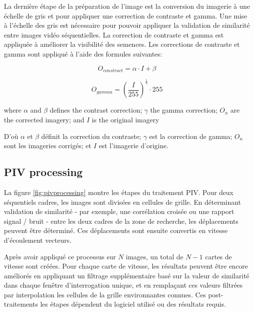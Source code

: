\documentclass[
]{article}
\begin{document}
La dernière étape de la préparation de l'image est la conversion du
imagerie à une échelle de gris et pour appliquer une correction de contraste et gamma.
Une mise à l'échelle des gris est nécessaire pour pouvoir appliquer la validation de similarité entre
images vidéo séquentielles. La correction de contraste et gamma est appliquée à
améliorer la visibilité des semences. Les corrections de contraste et gamma sont
appliqué à l'aide des formules suivantes:

\begin{equation}
O_{constract} = \alpha \cdot I + \beta
\label{eq:constract}
\end{equation}

\begin{equation}
O_{gamma} = \left(\frac{I}{255}\right)^\frac{1}{\gamma} \cdot 255
\label{eq:gamma}
\end{equation}

where \(\alpha\) and \(\beta\) defines the contrast correction; \(\gamma\) the
gamma correction; \(O_n\) are the corrected imagery; and \(I\) is the
original imagery

D'où \(\alpha\) et \(\beta\) définit la correction du contraste; \(\gamma\) est la correction de gamma; \(O_n\) sont les imageries corrigés; et \(I\) est l'imagerie d'origine.

\hypertarget{pp}{%
\subsection{PIV processing}\label{pp}}

La figure \ref{fig:pivprocessing} montre les étapes du traitement PIV. Pour deux séquentiels
cadres, les images sont divisées en cellules de grille. En déterminant
validation de similarité - par exemple, une corrélation croisée ou une
rapport signal / bruit \citetext{\citealp[ ]{ran_application_2016}; \citealp{osorio-cano_method_2013}} -
entre les deux cadres de la zone de recherche, les déplacements peuvent être
déterminé. Ces déplacements sont ensuite convertis en vitesse d'écoulement
vecteurs.

Après avoir appliqué ce processus sur \(𝑁\) images, un total de \(𝑁− 1\) cartes de vitesse
sont créées. Pour chaque carte de vitesse, les résultats peuvent être encore améliorés
en appliquant un filtrage supplémentaire basé sur la valeur de similarité dans chaque
fenêtre d'interrogation unique, et en remplaçant ces valeurs filtrées par
interpolation les cellules de la grille environnantes connues. Ces post-traitements
les étapes dépendent du logiciel utilisé ou des résultats requis.
\end{document}
